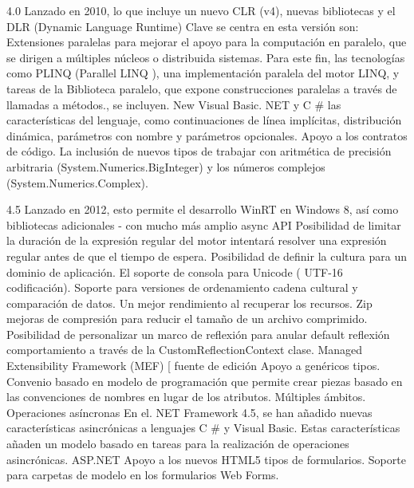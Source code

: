 4.0
Lanzado en 2010, lo que incluye un nuevo CLR (v4), nuevas bibliotecas y el DLR (Dynamic Language Runtime)
Clave se centra en esta versión son:
Extensiones paralelas para mejorar el apoyo para la computación en paralelo, que se dirigen a múltiples núcleos o distribuida sistemas. Para este fin, las tecnologías como PLINQ (Parallel LINQ ), una implementación paralela del motor LINQ, y tareas de la Biblioteca paralelo, que expone construcciones paralelas a través de llamadas a métodos., se incluyen. New Visual Basic. NET y C # las características del lenguaje, como continuaciones de línea implícitas, distribución dinámica, parámetros con nombre y parámetros opcionales. Apoyo a los contratos de código. La inclusión de nuevos tipos de trabajar con aritmética de precisión arbitraria (System.Numerics.BigInteger) y los números complejos (System.Numerics.Complex).

4.5
Lanzado en 2012, esto permite el desarrollo WinRT en Windows 8, así como bibliotecas adicionales - con mucho más amplio async API Posibilidad de limitar la duración de la expresión regular del motor intentará resolver una expresión regular antes de que el tiempo de espera. Posibilidad de definir la cultura para un dominio de aplicación. El soporte de consola para Unicode ( UTF-16 codificación). Soporte para versiones de ordenamiento cadena cultural y comparación de datos. Un mejor rendimiento al recuperar los recursos. Zip mejoras de compresión para reducir el tamaño de un archivo comprimido. Posibilidad de personalizar un marco de reflexión para anular default reflexión comportamiento a través de la CustomReflectionContext clase.
Managed Extensibility Framework (MEF) [ fuente de edición 
Apoyo a genéricos tipos.
Convenio basado en modelo de programación que permite crear piezas basado en las convenciones de nombres en lugar de los atributos.
Múltiples ámbitos.
Operaciones asíncronas 
En el. NET Framework 4.5, se han añadido nuevas características asincrónicas a lenguajes C # y Visual Basic. Estas características añaden un modelo basado en tareas para la realización de operaciones asincrónicas.
ASP.NET
Apoyo a los nuevos HTML5 tipos de formularios. Soporte para carpetas de modelo en los formularios Web Forms.
